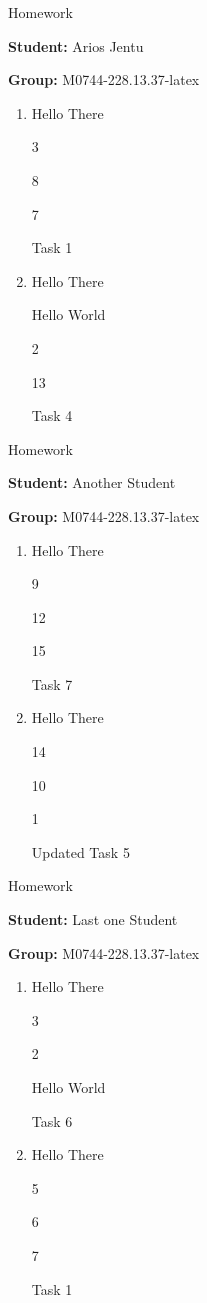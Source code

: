 \documentclass[12pt, fleqn, a4paper]{article}
\newcommand{\preamble}{\lipsum[1]}
\newcommand{\generatepage}[4]{
	\begin{center}
		{\Large #1}

		\textbf{Student:} #2

		\textbf{Group:} #3

	\end{center}

	\vspace{10pt}

	\preamble

	\begin{enumerate}
		#4
	\end{enumerate}

	\pagebreak
}
\begin{document}
	
	\generatepage{Homework}{Arios Jentu}{M0744-228.13.37-latex}{
		\item Hello There

			3

			8

			7

			Task 1
		\item Hello There

			Hello World

			2

			13

			Task 4
	}

	\generatepage{Homework}{Another Student}{M0744-228.13.37-latex}{
		\item Hello There

			9

			12

			15

			Task 7
		\item Hello There

			14

			10

			1

			Updated Task 5
	}

	\generatepage{Homework}{Last one Student}{M0744-228.13.37-latex}{
		\item Hello There

			3

			2

			Hello World

			Task 6
		\item Hello There

			5

			6

			7

			Task 1
	}
\end{document}
